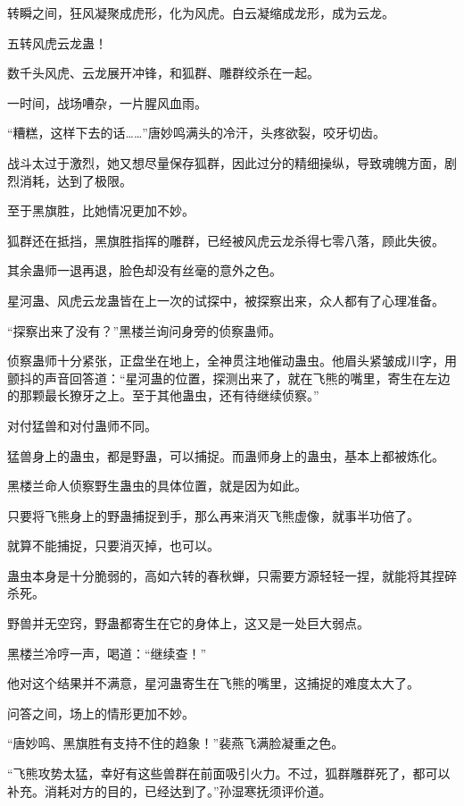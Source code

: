\begin{this_body}
转瞬之间，狂风凝聚成虎形，化为风虎。白云凝缩成龙形，成为云龙。

五转风虎云龙蛊！

数千头风虎、云龙展开冲锋，和狐群、雕群绞杀在一起。

一时间，战场嘈杂，一片腥风血雨。

“糟糕，这样下去的话……”唐妙鸣满头的冷汗，头疼欲裂，咬牙切齿。

战斗太过于激烈，她又想尽量保存狐群，因此过分的精细操纵，导致魂魄方面，剧烈消耗，达到了极限。

至于黑旗胜，比她情况更加不妙。

狐群还在抵挡，黑旗胜指挥的雕群，已经被风虎云龙杀得七零八落，顾此失彼。

其余蛊师一退再退，脸色却没有丝毫的意外之色。

星河蛊、风虎云龙蛊皆在上一次的试探中，被探察出来，众人都有了心理准备。

“探察出来了没有？”黑楼兰询问身旁的侦察蛊师。

侦察蛊师十分紧张，正盘坐在地上，全神贯注地催动蛊虫。他眉头紧皱成川字，用颤抖的声音回答道：“星河蛊的位置，探测出来了，就在飞熊的嘴里，寄生在左边的那颗最长獠牙之上。至于其他蛊虫，还有待继续侦察。”

对付猛兽和对付蛊师不同。

猛兽身上的蛊虫，都是野蛊，可以捕捉。而蛊师身上的蛊虫，基本上都被炼化。

黑楼兰命人侦察野生蛊虫的具体位置，就是因为如此。

只要将飞熊身上的野蛊捕捉到手，那么再来消灭飞熊虚像，就事半功倍了。

就算不能捕捉，只要消灭掉，也可以。

蛊虫本身是十分脆弱的，高如六转的春秋蝉，只需要方源轻轻一捏，就能将其捏碎杀死。

野兽并无空窍，野蛊都寄生在它的身体上，这又是一处巨大弱点。

黑楼兰冷哼一声，喝道：“继续查！”

他对这个结果并不满意，星河蛊寄生在飞熊的嘴里，这捕捉的难度太大了。

问答之间，场上的情形更加不妙。

“唐妙鸣、黑旗胜有支持不住的趋象！”裴燕飞满脸凝重之色。

“飞熊攻势太猛，幸好有这些兽群在前面吸引火力。不过，狐群雕群死了，都可以补充。消耗对方的目的，已经达到了。”孙湿寒抚须评价道。

\end{this_body}

